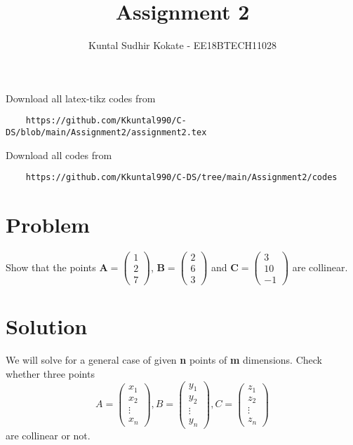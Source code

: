 \documentclass[journal,12pt,twocolumn]{IEEEtran}
\begin{document}
     \def\rightbox#1{\makebox[0in][r]{#1}}
     \def\centbox#1{\makebox[0in]{#1}}
     \def\topbox#1{\raisebox{-\baselineskip}[0in][0in]{#1}}
     \def\midbox#1{\raisebox{-0.5\baselineskip}[0in][0in]{#1}}
\vspace{3cm}
\title{Assignment 2}
\author{Kuntal Sudhir Kokate - EE18BTECH11028}
\maketitle
\newpage
\bigskip
\renewcommand{\thefigure}{\theenumi}
\renewcommand{\thetable}{\theenumi}
Download all latex-tikz codes from 
%
\begin{lstlisting}
    https://github.com/Kkuntal990/C-DS/blob/main/Assignment2/assignment2.tex
\end{lstlisting}

Download all codes from 
\begin{lstlisting}
    https://github.com/Kkuntal990/C-DS/tree/main/Assignment2/codes
\end{lstlisting}
\section{Problem}
Show that the points $\textbf{A} = \begin{pmatrix} 1 \\ 2 \\ 7 \end{pmatrix}$, $\textbf{B} = \begin{pmatrix} 2 \\ 6 \\ 3 \end{pmatrix}$ and $\textbf{C} = \begin{pmatrix} 3 \\ 10 \\ -1 \end{pmatrix}$ are collinear.
\section{Solution}
We will solve for a general case of given \textbf{n} points of \textbf{m} dimensions.
Check whether three points
\[
    A =
    \begin{pmatrix}
        x_{1}  \\
        x_{2}  \\
        \vdots \\
        x_{n}
    \end{pmatrix},
    B =
    \begin{pmatrix}
        y_{1}  \\
        y_{2}  \\
        \vdots \\
        y_{n}
    \end{pmatrix},
    C =
    \begin{pmatrix}
        z_{1}  \\
        z_{2}  \\
        \vdots \\
        z_{n}
    \end{pmatrix}
\]
are collinear or not.
\end{document}
